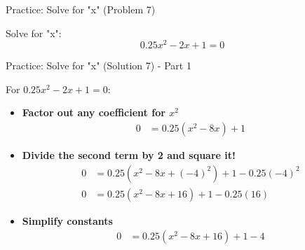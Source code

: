 \documentclass[aspectratio=169]{beamer}
\begin{document}
\begin{frame}{Practice: Solve for "x" (Problem 7)}
    \begin{tcolorbox}[colback=lightgray,colframe=primary,title=Problem 7]
        \footnotesize
        Solve for "x":
        \[ 0.25x^2 - 2x + 1 = 0 \]
    \end{tcolorbox}
\end{frame}

\begin{frame}{Practice: Solve for "x" (Solution 7) - Part 1}
    \begin{tcolorbox}[colback=lightgray,colframe=accent,title=Solution 7 - Part 1]
        \footnotesize
        For $0.25x^2 - 2x + 1 = 0$:
        \begin{itemize}
            \item \textbf{Factor out any coefficient for $x^2$}
                \begin{align*}
                    0 &= 0.25(x^2 - 8x) + 1
                \end{align*}
            \item \textbf{Divide the second term by 2 and square it!}
                \begin{align*}
                    0 &= 0.25(x^2 - 8x + (-4)^2) + 1 - 0.25(-4)^2 \\
                    0 &= 0.25(x^2 - 8x + 16) + 1 - 0.25(16)
                \end{align*}
            \item \textbf{Simplify constants}
                \begin{align*}
                    0 &= 0.25(x^2 - 8x + 16) + 1 - 4
                \end{align*}
        \end{itemize}
    \end{tcolorbox}
\end{frame}
\end{document}
